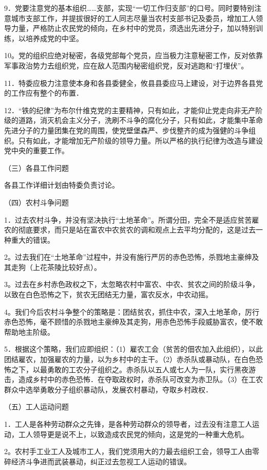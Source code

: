 9．党要注意党的基本组织……支部，实现“一切工作归支部”的口号。同时要特别注意城市支部工作，并提拔很好的工人同志尽量当农村支部书记及委员，增加工人领导力量，严格防止农民党的倾向，在乡村中的党员，须选出先进分子，加以特别训练，以培养成党的中坚。

10。党的组织应绝对秘密，各级党部每个党员，应当极力注意秘密工作，反对依靠军事政治势力去组织党，应在敌人范围内秘密组织党，反对逃跑和“打埋伏”。

11．特委应极力注意使本身和各县委健全，攸县县委应马上建设，对于边界各县党的工作应有整个的布置．

12．“铁的纪律”为布尔什维克党的主要精神，只有如此，才能仰止党走向非无产阶级的道路，消灭机会主义分子，洗刷不斗争的腐化分子，只有如此，才能集中革命先进分子的力量团集在党的周围，使党壁堡森严、步伐整齐的成为强健的斗争组织。只有如此，才能增加无产阶级的领导力量。所以严格的执行纪律为改造与建设党中央的重要工作。

（三）各县工作问题

各县工作详细计划由特委负责讨论。

（四）农村斗争问题

1．过去农村斗争，并没有坚决执行“土地革命”。所谓分田，完全不是适应贫苦雇农的彻底要求，而只是站在富农中农贫农的调和观点上去平均分配的，这是过去一种重大的错误。

2。过去我们在“土地革命”过程中，并没有施行严厉的赤色恐怖，杀戮地主豪绅及其走狗（上花茶陵比较好点）。

3。过去在乡村赤色政权之下，太忽略农村中富农、中农、贫农之间的阶级斗争，以致在白色恐怖之下，贫农无团结无力量，富农反水，中农动摇。

4。我们今后农村斗争整个的策略是：团结贫农，抓住中农，深入土地革命，厉行赤色恐怖，毫不顾惜的杀戮地主豪绅及其走狗，用赤色恐怖手段威胁富农，使不敢帮助地主阶级。

5．根据这个策略，我们应即组织：（1）雇农工会（贫苦的佃农加入此组织），以此团结雇农，加强雇农的力量，以为乡村中的主干。（2）赤杀队或暴动队，在白色恐怖之下，以最勇敢的工农分子组织之。赤杀队以五人或七人为一队，实行黑夜游击，造成乡村中的赤色恐怖．在夺取政权时，赤杀队可改变为赤卫队。（3）在工农群众中选举勇敢分子组织暴动队，发展农村暴动，夺取乡村政权．

（五）工人运动问题

1．工人是各种劳动群众之先锋，是各种劳动群众的领导者，过去没有注意工人运动，工人领导更是说不上，以致造成农民党的倾向，这是党的一种重大危机。

2。农村手工业工人及城市工人，我们党须用大的力最去组织工会，领导工人由零碎经济斗争进而武装暴动，纠正过去忽视工人运动的错误。


